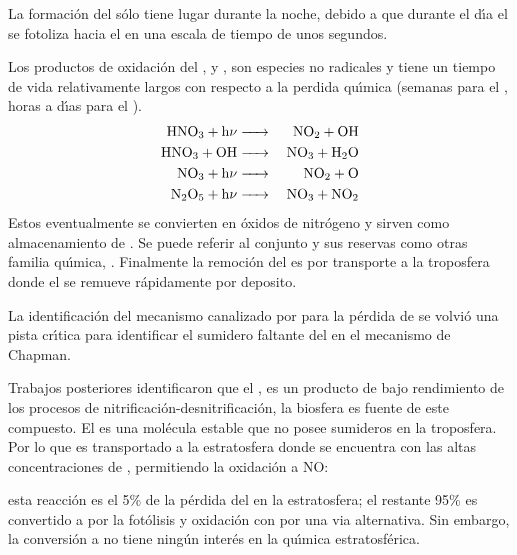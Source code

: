 La formaci\'on del  s\'olo tiene lugar durante la noche, debido a que durante el d\'{\i}a el  se fotoliza hacia el  en una escala de tiempo de unos segundos.

Los productos de oxidaci\'on del ,  y , son especies no radicales y tiene un tiempo de vida relativamente largos con respecto a la perdida qu\'{\i}mica (semanas para el , horas a d\'{\i}as para el ). 
\begin{eqnarray*}
 \ce{HNO3 + h$\nu$   & ->   & NO2 + OH \\
       HNO3 + OH        &  ->  & NO3 + H2O\\
       NO3  + h$\nu$    & ->   & NO2 + O\\
       N2O5 + h$\nu$   & ->   & NO3 + NO2}
\end{eqnarray*}
Estos eventualmente se convierten en \'oxidos de nitr\'ogeno  
y sirven como almacenamiento de . Se puede referir al conjunto  y sus reservas como otras familia qu\'{\i}mica, . Finalmente la remoci\'on del  es por transporte a la troposfera donde el  se remueve r\'apidamente por deposito.

La identificaci\'on del mecanismo canalizado por  para la p\'erdida de  se volvi\'o una pista cr\'{\i}tica para identificar el sumidero faltante del  en el mecanismo de Chapman.

Trabajos posteriores identificaron que el , es un producto de bajo rendimiento de los procesos de nitrificaci\'on-desnitrificaci\'on, la biosfera es fuente de este compuesto. El  es una mol\'ecula estable que no posee sumideros en la troposfera. Por lo que es transportado a la estratosfera donde se encuentra con las altas concentraciones de , permitiendo la oxidaci\'on a NO:

esta reacci\'on es el 5\% de la p\'erdida del   en la estratosfera; el restante 95\% es convertido a  por la fot\'olisis y oxidaci\'on con    por una via alternativa. Sin embargo, la conversi\'on a  no tiene ning\'un inter\'es en la qu\'{\i}mica estratosf\'erica.

